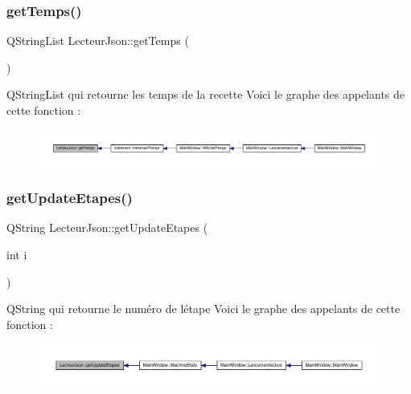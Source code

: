\subsubsection{\texorpdfstring{get\+Temps()}{getTemps()}}
{\footnotesize\ttfamily Q\+String\+List Lecteur\+Json\+::get\+Temps (\begin{DoxyParamCaption}{ }\end{DoxyParamCaption})\hspace{0.3cm}{\ttfamily [inline]}}

Q\+String\+List qui retourne les temps de la recette Voici le graphe des appelants de cette fonction \+:
\nopagebreak
\begin{figure}[H]
\begin{center}
\leavevmode
\includegraphics[width=350pt]{class_lecteur_json_a88d73523c1775a8c7001b5abae152740_icgraph}
\end{center}
\end{figure}
\mbox{\label{class_lecteur_json_ad3a86b8dc577d1e6d77a66b8ece8442a}} 
\subsubsection{\texorpdfstring{get\+Update\+Etapes()}{getUpdateEtapes()}}
{\footnotesize\ttfamily Q\+String Lecteur\+Json\+::get\+Update\+Etapes (\begin{DoxyParamCaption}\item[{int}]{i }\end{DoxyParamCaption})\hspace{0.3cm}{\ttfamily [inline]}}

Q\+String qui retourne le numéro de l\textquotesingle{}étape Voici le graphe des appelants de cette fonction \+:
\nopagebreak
\begin{figure}[H]
\begin{center}
\leavevmode
\includegraphics[width=350pt]{class_lecteur_json_ad3a86b8dc577d1e6d77a66b8ece8442a_icgraph}
\end{center}
\end{figure}
\mbox{\label{class_lecteur_json_a4ceacda970b2b838bb41211decdd799f}} 
